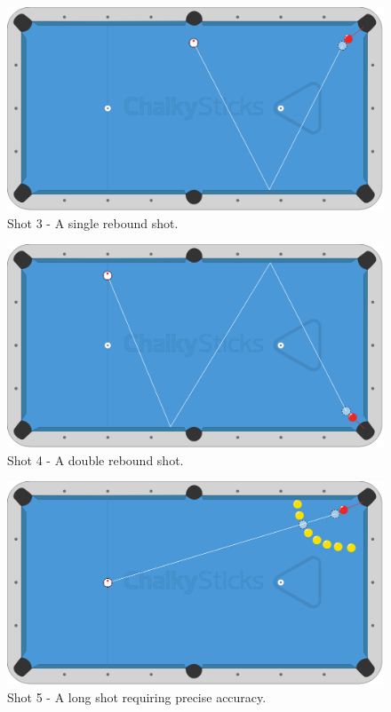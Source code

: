 \documentclass[ %
                author={Finn Alexander Wilkinson},
                supervisor={Dr. Andrew Calway},
                degree={MEng},
                title={\centering A Mixed Reality Aim Assistant for Pool and Snooker},
                subtitle={},
                type={Enterprise},
                year={2021} ]{dissertation}
\begin{document}
\begin{figure}[h]
    \centering
    \includegraphics[scale = 0.2]{Images/Shot Diagrams/Shot_3.png}
    \caption{Shot 3 - A single rebound shot.}
    \label{fig:shot3}
\end{figure}

\begin{figure}[h]
    \centering
    \includegraphics[scale = 0.2]{Images/Shot Diagrams/Shot_4.png}
    \caption{Shot 4 - A double rebound shot.}
    \label{fig:shot4}
\end{figure}

\begin{figure}[h]
    \centering
    \includegraphics[scale = 0.2]{Images/Shot Diagrams/Shot_5.png}
    \caption{Shot 5 - A long shot requiring precise accuracy.}
    \label{fig:shot5}
\end{figure}
\end{document}
